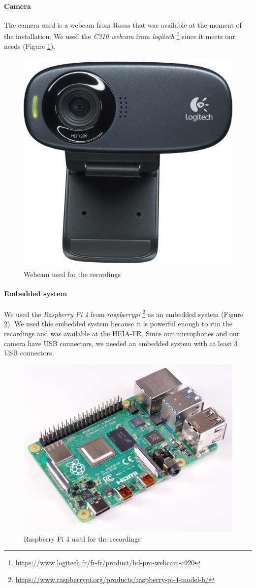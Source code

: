 \paragraph{Camera}
The camera used is a webcam from Rosas that was available at the moment of the installation. We used the \textit{C310 webcam} from \textit{logitech} \footnote{\url{https://www.logitech.fr/fr-fr/product/hd-pro-webcam-c920}} since it meets our needs (Figure \ref{fig:c310_webcam}). 

\begin{figure}[H]
    \centering
    \includegraphics[width=.5\textwidth]{images/c310_webcam.png}
    \caption{Webcam used for the recordings}
    \label{fig:c310_webcam}
\end{figure}

\paragraph{Embedded system}
We used the \textit{Raspberry Pi 4} from \textit{raspberrypi} \footnote{\url{https://www.raspberrypi.org/products/raspberry-pi-4-model-b/}} as an embedded system (Figure \ref{fig:raspberry_pi_4}). We used this embedded system because it is powerful enough to run the recordings and was available at the HEIA-FR. Since our microphones and our camera have USB connectors, we needed an embedded system with at least 3 USB connectors.

\begin{figure}[H]
    \centering
    \includegraphics[width=.5\textwidth]{images/raspberry_pi_4.png}
    \caption{Raspberry Pi 4 used for the recordings}
    \label{fig:raspberry_pi_4}
\end{figure}

